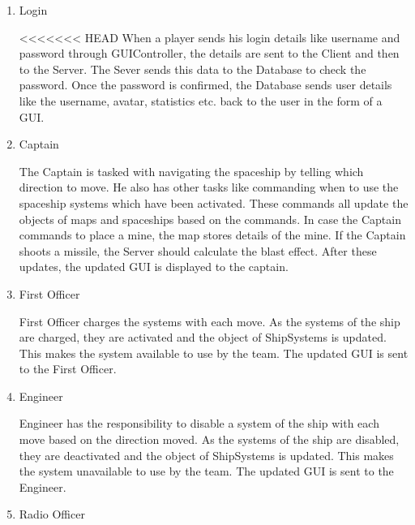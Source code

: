 \begin{enumerate}
\item Login


<<<<<<< HEAD
When a player sends his login details like username and password through GUIController, the details are sent to the Client and then to the Server. The Sever sends this data to the Database to check the password. Once the password is confirmed, the Database sends user details like the username, avatar, statistics etc. back to the user in the form of a GUI.

\item Captain


The Captain is tasked with navigating the spaceship by telling which direction to move. He also has other tasks like commanding when to use the spaceship systems which have been activated. These commands all update the objects of maps and spaceships based on the commands. In case the Captain commands to place a mine, the map stores details of the mine. If the Captain shoots a missile, the Server should calculate the blast effect. After these updates, the updated GUI is displayed to the captain.

\item First Officer


First Officer charges the systems with each move. As the systems of the ship are charged, they are activated and the object of ShipSystems is updated. This makes the system available to use by the team. The updated GUI is sent to the First Officer.

\item Engineer


Engineer has the responsibility to disable a system of the ship with each move based on the direction moved. As the systems of the ship are disabled, they are deactivated and the object of ShipSystems is updated. This makes the system unavailable to use by the team. The updated GUI is sent to the Engineer.

\item Radio Officer



\end{enumerate}
